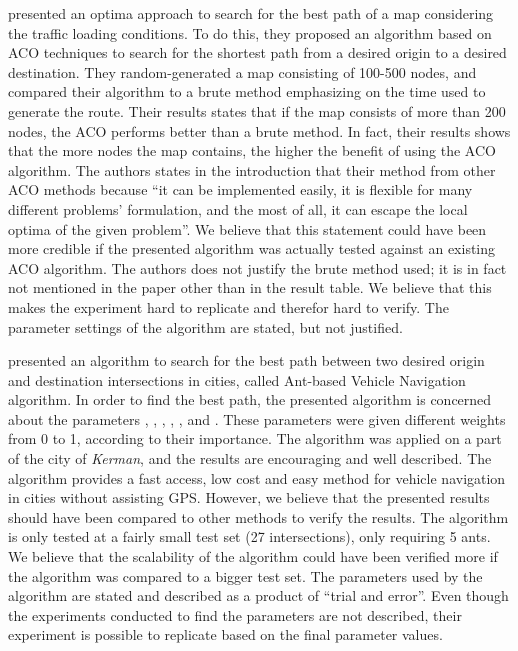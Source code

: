 \citet{hsiao04} presented an optima approach to search for the best path of a map considering the traffic loading conditions. To do this, they proposed an algorithm based on ACO techniques to search for the shortest path from a desired origin to a desired destination. They random-generated a map consisting of 100-500 nodes, and compared their algorithm to a brute method emphasizing on the time used to generate the route. Their results states that if the map consists of more than 200 nodes, the ACO performs better than a brute method. In fact, their results shows that the more nodes the map contains, the higher the benefit of using the ACO algorithm. The authors states in the introduction that their method from other ACO methods because ``it can be implemented easily, it is flexible for many different problems' formulation, and the most of all, it can escape the local optima of the given problem''. We believe that this statement could have been more credible if the presented algorithm was actually tested against an existing ACO algorithm. The authors does not justify the brute method used; it is in fact not mentioned in the paper other than in the result table. We believe that this makes the experiment hard to replicate and therefor hard to verify. The parameter settings of the algorithm are stated, but not justified.

\citet{salehi-nezhad07} presented an algorithm to search for the best path between two desired origin and destination intersections in cities, called Ant-based Vehicle Navigation algorithm. In order to find the best path, the presented algorithm is concerned about the parameters , , , , , and . These parameters were given different weights from 0 to 1, according to their importance. The algorithm was applied on a part of the city of \textit{Kerman}, and the results are encouraging and well described. The algorithm provides a fast access, low cost and easy method for vehicle navigation in cities without assisting GPS. However, we believe that the presented results should have been compared to other methods to verify the results. The algorithm is only tested at a fairly small test set (27 intersections), only requiring 5 ants. We believe that the scalability of the algorithm could have been verified more if the algorithm was compared to a bigger test set. The parameters used by the algorithm are stated and described as a product of ``trial and error''. Even though the experiments conducted to find the parameters are not described, their experiment is possible to replicate based on the final parameter values. 

